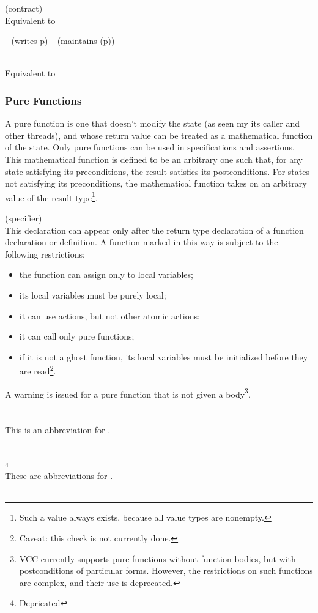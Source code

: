 \documentclass[preprint,nocopyrightspace]{sigplanconf}
\begin{document}
{{{{\begin{VCC}
 (contract)\\
Equivalent to
\begin{VCC}
  _(writes p)
  _(maintains \mutable(p))
\end{VCC}

\\
Equivalent to 

\subsubsection{Pure Functions}
A pure function is one that doesn't modify the state (as seen my its
caller and other threads), and whose return value can be treated as a
mathematical function of the state. Only pure functions can be used in
specifications and assertions. This mathematical function is defined
to be an arbitrary one such that, for any state satisfying its
preconditions, the result satisfies its postconditions. For states not
satisfying its preconditions, the mathematical function takes on an
arbitrary value of the result type\footnote{Such a value always exists,
because all value types are nonempty.}.

 (specifier)\\
This declaration can appear only after the return type declaration of
a function declaration or definition. A function marked in this way is
subject to the following restrictions:
\begin{itemize}
\item the function can assign only to local variables;
\item its local variables must be purely local;
\item it can use  actions, but not other atomic actions;
\item it can call only pure functions;
\item if it is not a ghost function, its local variables must be
initialized before they are read\footnote{Caveat: this check is not
currently done.}.
\end{itemize}

A warning is issued for a pure function that is not given a
body\footnote{
VCC currently supports pure functions without function
bodies, but with postconditions of particular forms. However, the
restrictions on such functions are complex, and their use is
deprecated.
}.
\\\\
\\
This is an abbreviation for 
.
\\\\
\\
\footnote{Depricated}\\
These are abbreviations for . 
\\\\

\end{VCC}}}}}
\end{document}

